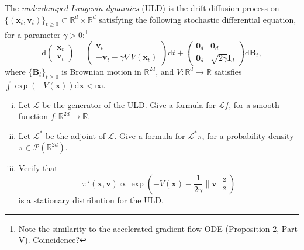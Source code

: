 The \emph{underdamped Langevin dynamics} (ULD) is the drift-diffusion process on $\{(\mathbf{x}_t, \mathbf{v}_t)\}_{t \geq 0} \subset \mathbb{R}^d \times \mathbb{R}^d$ satisfying the following stochastic differential equation, for a parameter $\gamma > 0$:\footnote{Note the similarity to the accelerated gradient flow ODE (Proposition 2, Part V). Coincidence?}
\[
\mathrm{d} \begin{pmatrix} \mathbf{x}_t \\ \mathbf{v}_t \end{pmatrix} = \begin{pmatrix} \mathbf{v}_t \\ -\mathbf{v}_t - \gamma \nabla V(\mathbf{x}_t) \end{pmatrix} \mathrm{d}t + \begin{pmatrix} \mathbf{0}_d & \mathbf{0}_d \\ \mathbf{0}_d & \sqrt{2\gamma}\mathbf{I}_d \end{pmatrix} \mathrm{d}\mathbf{B}_t,
\]
where $\{\mathbf{B}_t\}_{t \geq 0}$ is Brownian motion in $\mathbb{R}^{2d}$, and $V : \mathbb{R}^d \to \mathbb{R}$ satisfies $\int \exp(-V(\mathbf{x})) \mathrm{d}\mathbf{x} < \infty$.

\begin{enumerate}[(i)]
    \item Let $\mathcal{L}$ be the generator of the ULD. Give a formula for $\mathcal{L}f$, for a smooth function $f : \mathbb{R}^{2d} \to \mathbb{R}$.
    \item Let $\mathcal{L}^*$ be the adjoint of $\mathcal{L}$. Give a formula for $\mathcal{L}^* \pi$, for a probability density $\pi \in \mathcal{P}(\mathbb{R}^{2d})$.
    \item Verify that
    \[
    \pi^\star(\mathbf{x}, \mathbf{v}) \propto \exp\left( -V(\mathbf{x}) - \frac{1}{2\gamma} \|\mathbf{v}\|_2^2 \right)
    \]
    is a stationary distribution for the ULD.
\end{enumerate}
